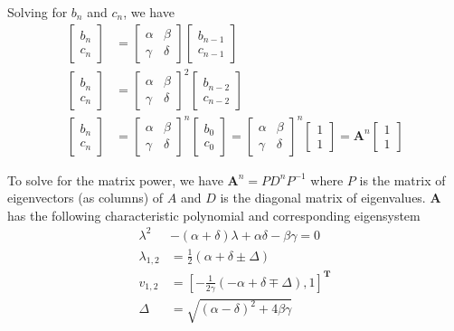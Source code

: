 \documentclass[a4paper, 11pt]{article}
\begin{document}
Solving for $b_n$ and $c_n$, we have
\begin{align*}
	\begin{bmatrix}
	b_n\\
	c_n
	\end{bmatrix}
	&=
	\begin{bmatrix}
	\alpha & \beta \\
	\gamma & \delta 
	\end{bmatrix}
	\begin{bmatrix}
	b_{n-1}\\
	c_{n-1}
	\end{bmatrix}\\
	\begin{bmatrix}
	b_n\\
	c_n
	\end{bmatrix}
	&=
	\begin{bmatrix}
	\alpha & \beta \\
	\gamma & \delta 
	\end{bmatrix}^2
	\begin{bmatrix}
	b_{n-2}\\
	c_{n-2}
	\end{bmatrix}\\
	\begin{bmatrix}
	b_n\\
	c_n
	\end{bmatrix}
	&=
	\begin{bmatrix}
	\alpha & \beta \\
	\gamma & \delta 
	\end{bmatrix}^n
	\begin{bmatrix}
	b_0\\
	c_0
	\end{bmatrix}
	=
	\begin{bmatrix}
	\alpha & \beta \\
	\gamma & \delta 
	\end{bmatrix}^n
	\begin{bmatrix}
	1\\1
	\end{bmatrix}
	=
	\mathbf{A}^n
	\begin{bmatrix}
	1\\1
	\end{bmatrix}
\end{align*}

To solve for the matrix power, we have $\mathbf{A}^n = PD^nP^{-1}$ where $P$ is the matrix of eigenvectors (as columns) of $A$ and $D$ is the diagonal matrix of eigenvalues. $\mathbf{A}$ has the following characteristic polynomial and corresponding eigensystem
\begin{align*}
	\lambda^2 &- (\alpha + \delta)\lambda + \alpha \delta - \beta \gamma = 0\\
	\lambda_{1, 2} &= \frac{1}{2}\left( \alpha + \delta \pm \Delta \right)\\
	v_{1, 2} &= \left[ -\frac{1}{2\gamma} \left(-\alpha + \delta \mp \Delta \right), 1 \right]^{\mathbf{T}}\\
	\Delta &= \sqrt{(\alpha - \delta)^2 + 4 \beta \gamma}
\end{align*}
\end{document}
